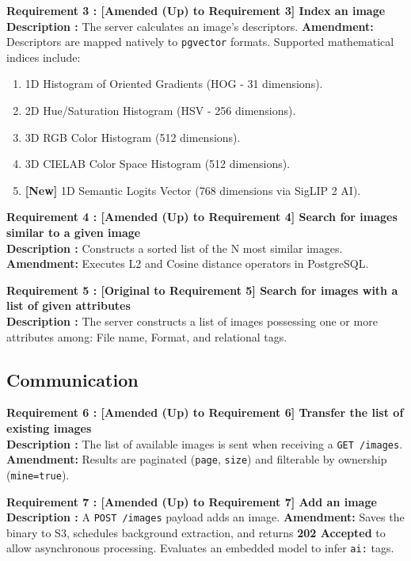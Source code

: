 \documentclass[12pt, a4paper]{article}
\begin{document}
\noindent\textbf{Requirement 3 : [Amended (Up) to Requirement 3] Index an image}\\
\textbf{Description :} The server calculates an image's descriptors. \textbf{Amendment:} Descriptors are mapped natively to \texttt{pgvector} formats. Supported mathematical indices include:
\begin{enumerate}
    \item 1D Histogram of Oriented Gradients (HOG - 31 dimensions).
    \item 2D Hue/Saturation Histogram (HSV - 256 dimensions).
    \item 3D RGB Color Histogram (512 dimensions).
    \item 3D CIELAB Color Space Histogram (512 dimensions).
    \item \textbf{[New]} 1D Semantic Logits Vector (768 dimensions via SigLIP 2 AI).
\end{enumerate}
\vspace{1em}

\noindent\textbf{Requirement 4 : [Amended (Up) to Requirement 4] Search for images similar to a given image}\\
\textbf{Description :} Constructs a sorted list of the N most similar images. \textbf{Amendment:} Executes L2 and Cosine distance operators in PostgreSQL.
\vspace{1em}

\noindent\textbf{Requirement 5 : [Original to Requirement 5] Search for images with a list of given attributes}\\
\textbf{Description :} The server constructs a list of images possessing one or more attributes among: File name, Format, and relational tags.
\vspace{1em}

\subsection*{Communication}

\noindent\textbf{Requirement 6 : [Amended (Up) to Requirement 6] Transfer the list of existing images}\\
\textbf{Description :} The list of available images is sent when receiving a \texttt{GET /images}. \textbf{Amendment:} Results are paginated (\texttt{page}, \texttt{size}) and filterable by ownership (\texttt{mine=true}).
\vspace{1em}

\noindent\textbf{Requirement 7 : [Amended (Up) to Requirement 7] Add an image}\\
\textbf{Description :} A \texttt{POST /images} payload adds an image. \textbf{Amendment:} Saves the binary to S3, schedules background extraction, and returns \textbf{202 Accepted} to allow asynchronous processing. Evaluates an embedded model to infer \texttt{ai:} tags.
\vspace{1em}
\end{document}
